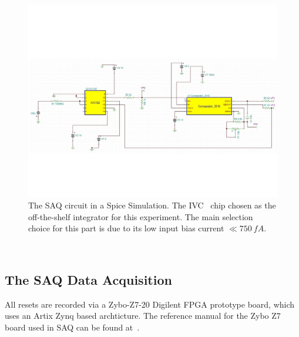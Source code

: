 \begin{figure}[]
\centering
\includegraphics[width=\textwidth]{images/SAQ_spice_circuit.pdf}
\caption{The SAQ circuit in a Spice Simulation. The IVC~\citep{ivc_datasheet} chip chosen as the off-the-shelf integrator for this experiment. The main selection choice for this part is due to its low input bias current $\ll 750~\unit{fA}$.}
\end{figure}~\label{fig:saq_circuit_spice}


\subsection{The SAQ Data Acquisition}

All resets are recorded via a Zybo-Z7-20 Digilent FPGA prototype board, which uses an Artix Zynq based archticture.
The reference manual for the Zybo Z7 board used in SAQ can be found at~\citep{zybo_zy_reference}.

